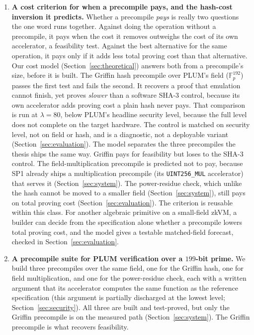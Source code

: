 \begin{enumerate}
  \item \textbf{A cost criterion for when a precompile pays, and the hash-cost inversion it predicts.} Whether a precompile \emph{pays} is really two questions the one word runs together. Against doing the operation without a precompile, it pays when the cost it removes outweighs the cost of its own accelerator, a feasibility test. Against the best alternative for the same operation, it pays only if it adds less total proving cost than that alternative. Our cost model (Section~\ref{sec:theoretical}) answers both from a precompile's size, before it is built. The Griffin hash precompile over PLUM's field ($\mathbb{F}_p^{192}$)~\cite{cryptoeprint:2022/403} passes the first test and fails the second. It recovers a proof that emulation cannot finish, yet proves \emph{slower} than a software SHA-3 control, because its own accelerator adds proving cost a plain hash never pays. That comparison is run at $\lambda{=}80$, below PLUM's headline security level, because the full level does not complete on the target hardware. The control is matched on security level, not on field or hash, and is a diagnostic, not a deployable variant (Section~\ref{sec:evaluation}). The model separates the three precompiles the thesis ships the same way. Griffin pays for feasibility but loses to the SHA-3 control. The field-multiplication precompile is predicted not to pay, because SP1 already ships a multiplication precompile (its \texttt{UINT256\_MUL} accelerator) that serves it (Section~\ref{sec:system}). The power-residue check, which unlike the hash cannot be moved to a smaller field (Section~\ref{sec:system}), still pays on total proving cost (Section~\ref{sec:evaluation}). The criterion is reusable within this class. For another algebraic primitive on a small-field zkVM, a builder can decide from the specification alone whether a precompile lowers total proving cost, and the model gives a testable matched-field forecast, checked in Section~\ref{sec:evaluation}.

  \item \textbf{A precompile suite for PLUM verification over a $199$-bit prime.} We build three precompiles over the same field, one for the Griffin hash, one for field multiplication, and one for the power-residue check, each with a written argument that its accelerator computes the same function as the reference specification (this argument is partially discharged at the lowest level; Section~\ref{sec:security}). All three are built and test-proved, but only the Griffin precompile is on the measured path (Section~\ref{sec:system}). The Griffin precompile is what recovers feasibility.


\end{enumerate}
